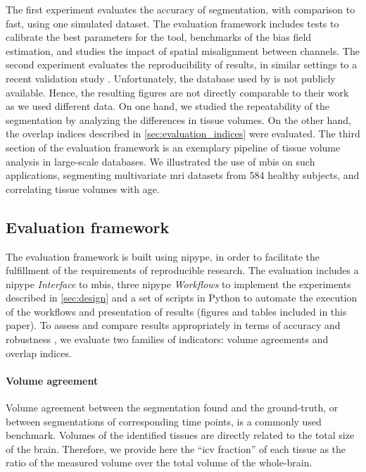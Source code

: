 The first experiment evaluates the accuracy of segmentation, with 
  comparison to \gls*{fast}, using one simulated dataset.
The evaluation framework includes tests to calibrate the best
  parameters for the tool, benchmarks of the bias field estimation,
  and studies the impact of spatial misalignment between channels.
The second experiment evaluates the reproducibility of results, in
  similar settings to a recent validation study \citep{de_boer_accuracy_2010}.
Unfortunately, the database used by \citeauthor{de_boer_accuracy_2010} is not
  publicly available.
Hence, the resulting figures are not directly comparable to their work as
  we used different data.
On one hand, we studied the repeatability of the segmentation by analyzing
  the differences in tissue volumes.
On the other hand, the overlap indices described in \autoref{sec:evaluation_indices}
  were evaluated.
The third section of the evaluation framework is an exemplary pipeline of
  tissue volume analysis in large-scale databases.
We illustrated the use of \gls*{mbis} on such applications, segmenting
  multivariate \gls*{mri} datasets from 584 healthy subjects, and correlating
  tissue volumes with age.

\subsection{Evaluation framework}
\label{sec:experimental_framework}
The evaluation framework is built using \gls*{nipype}, in order to facilitate the
  fulfillment of the requirements of reproducible research.
The evaluation includes a \gls*{nipype} \emph{Interface} to \gls*{mbis},
  three \gls*{nipype} \emph{Workflows} to implement the experiments
  described in \autoref{sec:design} and a set of scripts in Python to automate the
  execution of the workflows and presentation of results (figures and tables
  included in this paper).
To assess and compare results appropriately in terms of accuracy and 
  robustness \citep{altman_measurement_1983}, we evaluate two families of
  indicators: volume agreements and overlap indices.
  
\paragraph{Volume agreement}
Volume agreement between the segmentation found and the ground-truth, or
  between segmentations of corresponding time points, is a commonly used
  benchmark.
Volumes of the identified tissues are directly related to the total size
  of the brain.
Therefore, we provide here the ``\gls*{icv} fraction'' of each tissue
  as the ratio of the measured volume over the total volume of
  the whole-brain.

